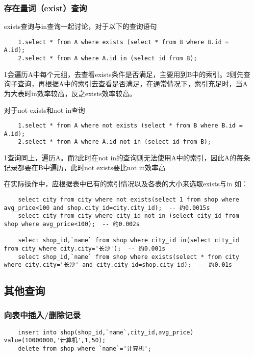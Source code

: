 \documentclass[a4paper, 11pt, nofonts, nocap, fancyhdr]{ctexart}
\begin{document}
\subsubsection{存在量词（exist）查询}
	
exists查询与in查询一起讨论，对于以下的查询语句

	\begin{lstlisting}
	1.select * from A where exists (select * from B where B.id = A.id);
	2.select * from A where A.id in (select id from B);
	\end{lstlisting}

	1会遍历A中每个元组，去查看exists条件是否满足，主要用到B中的索引。2则先查询子查询，再根据A中的索引去查看是否满足，在通常情况下，索引充足时，当A为大表时in效率较高，反之exists效率较高。

对于not exists和not in查询

	\begin{lstlisting}
	1.select * from A where not exists (select * from B where B.id = A.id);
	2.select * from A where A.id not in (select id from B);
	\end{lstlisting}

1查询同上，遍历A。而2此时在not in的查询则无法使用A中的索引，因此A的每条记录都要在B中遍历，此时not exists要比not in效率高

在实际操作中，应根据表中已有的索引情况以及各表的大小来选取exists与in
如：
	\begin{lstlisting}
	select city from city where not exists(select 1 from shop where avg_price<100 and shop.city_id=city.city_id);  -- 约0.0015s
	select city from city where city_id not in (select city_id from shop where avg_price<100);  -- 约0.002s

	select shop_id,`name` from shop where city_id in(select city_id from city where city.city='长沙');  -- 约0.001s
	select shop_id,`name` from shop where exists(select * from city where city.city='长沙' and city.city_id=shop.city_id);  -- 约0.01s
	\end{lstlisting}

\subsection{其他查询}

\subsubsection{向表中插入/删除记录}

	\begin{lstlisting}
	insert into shop(shop_id,`name`,city_id,avg_price) value(10000000,'计算机',1,50);
	delete from shop where `name`='计算机';
	\end{lstlisting}
\end{document}
